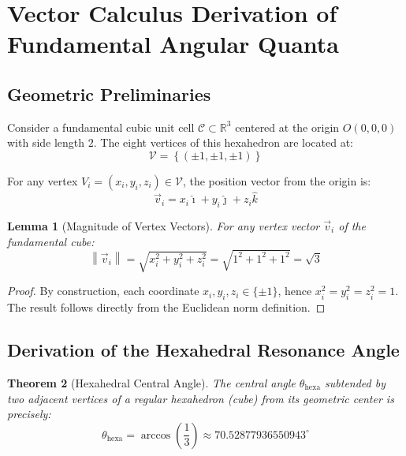 \documentclass[12pt,a4paper,oneside]{article}
\newtheorem{theorem}{Theorem}[section]
\newtheorem{lemma}[theorem]{Lemma}
\newcommand{\R}{\mathbb{R}}
\newcommand{\vecnorm}[1]{\left\|#1\right\|}
\begin{document}
\section{Vector Calculus Derivation of Fundamental Angular Quanta}

\subsection{Geometric Preliminaries}

Consider a fundamental cubic unit cell $\mathcal{C} \subset \R^3$ centered at the origin $O(0,0,0)$ with side length $2$. The eight vertices of this hexahedron are located at:
\begin{equation}
    \mathcal{V} = \left\{ (\pm 1, \pm 1, \pm 1) \right\}
\end{equation}

For any vertex $V_i = (x_i, y_i, z_i) \in \mathcal{V}$, the position vector from the origin is:
\begin{equation}
    \vec{v}_i = x_i \hat{\imath} + y_i \hat{\jmath} + z_i \hat{k}
\end{equation}

\begin{lemma}[Magnitude of Vertex Vectors]
\label{lem:magnitude}
For any vertex vector $\vec{v}_i$ of the fundamental cube:
\begin{equation}
    \vecnorm{\vec{v}_i} = \sqrt{x_i^2 + y_i^2 + z_i^2} = \sqrt{1^2 + 1^2 + 1^2} = \sqrt{3}
\end{equation}
\end{lemma}

\begin{proof}
By construction, each coordinate $x_i, y_i, z_i \in \{\pm 1\}$, hence $x_i^2 = y_i^2 = z_i^2 = 1$. The result follows directly from the Euclidean norm definition.
\end{proof}

\subsection{Derivation of the Hexahedral Resonance Angle}

\begin{theorem}[Hexahedral Central Angle]
\label{thm:hexa}
The central angle $\theta_{\text{hexa}}$ subtended by two \textit{adjacent} vertices of a regular hexahedron (cube) from its geometric center is precisely:
\begin{equation}
    \boxed{\theta_{\text{hexa}} = \arccos\left(\frac{1}{3}\right) \approx 70.52877936550943^\circ}
\end{equation}
\end{theorem}
\end{document}
